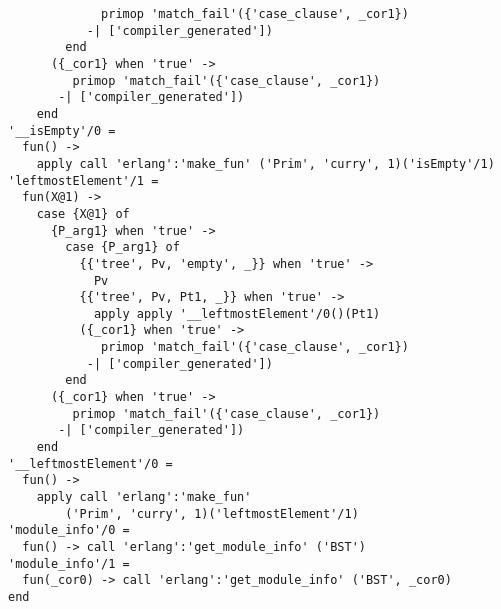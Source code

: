 \begin{lstlisting}
             primop 'match_fail'({'case_clause', _cor1})
           -| ['compiler_generated'])
        end
      ({_cor1} when 'true' ->
         primop 'match_fail'({'case_clause', _cor1})
       -| ['compiler_generated'])
    end
'__isEmpty'/0 =
  fun() ->
    apply call 'erlang':'make_fun' ('Prim', 'curry', 1)('isEmpty'/1)
'leftmostElement'/1 =
  fun(X@1) ->
    case {X@1} of
      {P_arg1} when 'true' ->
        case {P_arg1} of
          {{'tree', Pv, 'empty', _}} when 'true' ->
            Pv
          {{'tree', Pv, Pt1, _}} when 'true' ->
            apply apply '__leftmostElement'/0()(Pt1)
          ({_cor1} when 'true' ->
             primop 'match_fail'({'case_clause', _cor1})
           -| ['compiler_generated'])
        end
      ({_cor1} when 'true' ->
         primop 'match_fail'({'case_clause', _cor1})
       -| ['compiler_generated'])
    end
'__leftmostElement'/0 =
  fun() ->
    apply call 'erlang':'make_fun'
        ('Prim', 'curry', 1)('leftmostElement'/1)
'module_info'/0 =
  fun() -> call 'erlang':'get_module_info' ('BST')
'module_info'/1 =
  fun(_cor0) -> call 'erlang':'get_module_info' ('BST', _cor0)
end


\end{lstlisting}